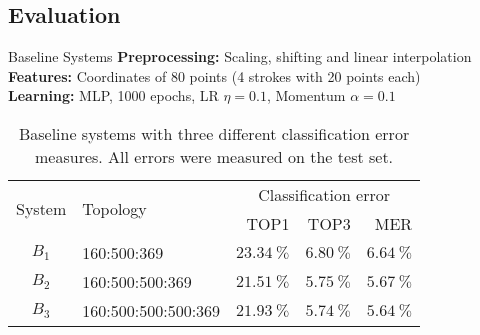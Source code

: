 \subsection{Evaluation}
\begin{frame}{Baseline Systems}
    \textbf{Preprocessing:} Scaling, shifting and linear interpolation\\
    \textbf{Features:} Coordinates of 80 points (4 strokes with 20 points each)\\
    \textbf{Learning:} MLP, 1000 epochs, LR $\eta=0.1$, Momentum $\alpha=0.1$
\begin{table}[h]
    \centering
    \begin{tabular}{clrrr}
    \toprule
    \multirow{2}{*}{System}  & \multirow{2}{*}{Topology} & \multicolumn{3}{c}{Classification error}\\
          &                         & TOP1                   & TOP3                  & MER \\\midrule
    $B_1$ & 160:500:369             & $\SI{23.34}{\percent}$ & $\SI{6.80}{\percent}$ & $\SI{6.64}{\percent}$ \\
    $B_2$ & 160:500:500:369         & \underline{$\SI{21.51}{\percent}$} & $\SI{5.75}{\percent}$ & $\SI{5.67}{\percent}$ \\
    $B_3$ & 160:500:500:500:369     & $\SI{21.93}{\percent}$ & \underline{$\SI{5.74}{\percent}$} & \underline{$\SI{5.64}{\percent}$} \\
    \bottomrule
    \end{tabular}
    \caption{Baseline systems with three different classification error measures.
             All errors were measured on the test set.}
\label{table:baseline-systems}
\end{table}
\end{frame}

